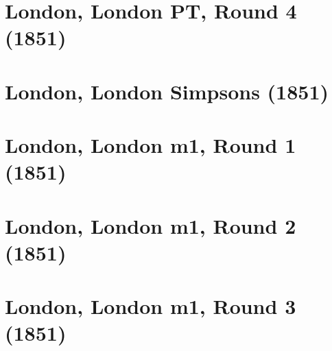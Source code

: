 \documentclass[11pt]{article}
\newcommand*\cleartoleftpage{%
   \clearpage
   \ifodd\value{page}\hbox{}\newpage\fi
}
\begin{document}
\cleartoleftpage



\cleartoleftpage



\cleartoleftpage



\cleartoleftpage



\cleartoleftpage



\cleartoleftpage

\section{London, London PT, Round 4 (1851)}


\cleartoleftpage



\cleartoleftpage



\cleartoleftpage



\cleartoleftpage

\section{London, London Simpsons (1851)}


\cleartoleftpage

\section{London, London m1, Round 1 (1851)}


\cleartoleftpage

\section{London, London m1, Round 2 (1851)}


\cleartoleftpage

\section{London, London m1, Round 3 (1851)}

\end{document}
